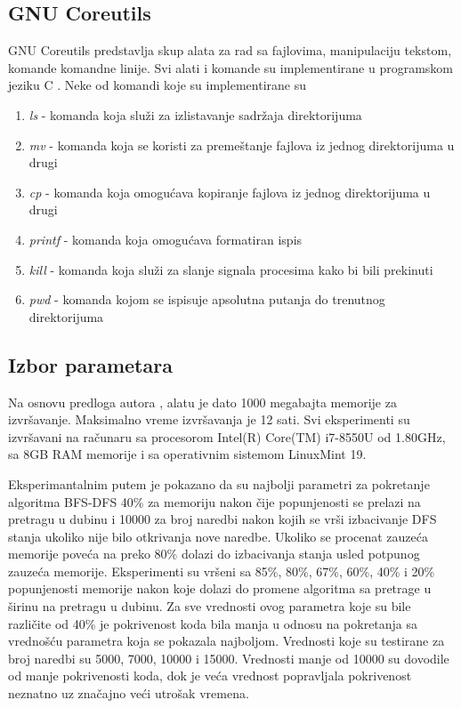 \documentclass[12pt,oneside]{memoir}
\begin{document}
\subsection{GNU Coreutils}
GNU Coreutils predstavlja skup alata za rad sa fajlovima, manipulaciju tekstom, komande komandne linije. Svi alati i komande su implementirane u programskom jeziku C \cite{coreutils}. Neke od komandi koje su implementirane su 

\begin{enumerate}
    \item \textit{ls} - komanda koja služi za izlistavanje sadržaja direktorijuma
    
    \item \textit{mv} - komanda koja se koristi za premeštanje fajlova iz jednog direktorijuma u drugi
    
    \item \textit{cp} - komanda koja omogućava kopiranje fajlova iz jednog direktorijuma u drugi
    
    \item \textit{printf} - komanda koja omogućava formatiran ispis
    
    \item \textit{kill} - komanda koja služi za slanje signala procesima kako bi bili prekinuti
    
    \item \textit{pwd} - komanda kojom se ispisuje apsolutna putanja do trenutnog direktorijuma
\end{enumerate} 

\subsection{Izbor parametara}
Na osnovu predloga autora \cite{klee}, alatu je dato 1000 megabajta memorije za izvršavanje. Maksimalno vreme izvršavanja je 12 sati. Svi eksperimenti su izvršavani na računaru sa procesorom Intel(R) Core(TM) i7-8550U od 1.80GHz, sa 8GB RAM memorije i sa operativnim sistemom LinuxMint 19.

Eksperimantalnim putem je pokazano da su najbolji parametri za pokretanje algoritma BFS-DFS 40\% za memoriju nakon čije popunjenosti se prelazi na pretragu u dubinu i 10000 za broj naredbi nakon kojih se vrši izbacivanje DFS stanja ukoliko nije bilo otkrivanja nove naredbe. Ukoliko se procenat zauzeća memorije poveća na preko 80\% dolazi do izbacivanja stanja usled potpunog zauzeća memorije. Eksperimenti su vršeni sa 85\%, 80\%, 67\%, 60\%, 40\% i 20\% popunjenosti memorije nakon koje dolazi do promene algoritma sa pretrage u širinu na pretragu u dubinu. Za sve vrednosti ovog parametra koje su bile različite od 40\% je pokrivenost koda bila manja u odnosu na pokretanja sa vrednošću parametra koja se pokazala najboljom. Vrednosti koje su testirane za broj naredbi su 5000, 7000, 10000 i 15000. Vrednosti manje od 10000 su dovodile od manje pokrivenosti koda, dok je veća vrednost popravljala pokrivenost neznatno uz značajno veći utrošak vremena.
\end{document}
